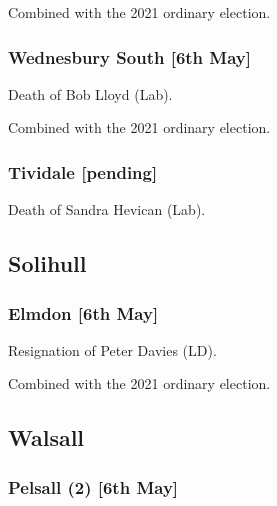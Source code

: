 \documentclass[a4paper,openany]{book}
\begin{document}
\begin{resultsiii}
Combined with the 2021 ordinary election.

\subsubsection*{Wednesbury South \hspace*{\fill}\nolinebreak[1]%
	\enspace\hspace*{\fill}
	[6th May]}


Death of Bob Lloyd (Lab).

Combined with the 2021 ordinary election.

\subsubsection*{Tividale \hspace*{\fill}\nolinebreak[1]%
	\enspace\hspace*{\fill}
	[pending]}


Death of Sandra Hevican (Lab).

\subsection*{Solihull}

\subsubsection*{Elmdon \hspace*{\fill}\nolinebreak[1]%
	\enspace\hspace*{\fill}
	[6th May]}


Resignation of Peter Davies (LD).

Combined with the 2021 ordinary election.

\subsection*{Walsall}

\subsubsection*{Pelsall (2) \hspace*{\fill}\nolinebreak[1]%
	\enspace\hspace*{\fill}
	[6th May]}


\end{resultsiii}
\end{document}
